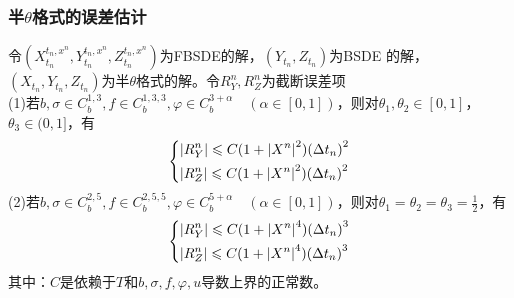 		\subsubsection{半$\theta$格式的误差估计}
			\par
			令$(X_{t_n}^{{t_n},{x^n}},Y_{t_n}^{{t_n},{x^n}},Z_{t_n}^{{t_n},{x^n}})$为FBSDE的解，$(Y_{t_n},Z_{t_n})$为BSDE 的解，$(X_{t_n},Y_{t_n},Z_{t_n})$为半$\theta$格式的解。令$R_Y^n,R_Z^n$为截断误差项\\
			\noindent (1)若${b,\sigma} \in C_b^{1,3},f \in C_b^{1,3,3},\varphi \in C_b^{3+\alpha}\quad (\alpha \in [0,1])$，则对${\theta_1,\theta_2 }\in [0,1]$，$\theta_3 \in (0,1]$，有
					\begin{equation*}
					\centering
					\left\{\begin{lgathered}
					{\left| {R_Y^n} \right| \leqslant C(1+{|X^n|}^2){({\Delta {t_n}})}^2}\\
					{\left| {R_Z^n} \right| \leqslant C(1+{|X^n|}^2){({\Delta {t_n}})}^2}
					\end{lgathered} \right.
						\end{equation*}
			\noindent (2)若${b,\sigma} \in C_b^{2,5},f \in C_b^{2,5,5},\varphi \in C_b^{5+\alpha}\quad (\alpha \in [0,1])$，则对$\theta_1=\theta_2 =\theta_3 =\frac 12$，有
					\begin{equation*}
					\centering
					\left\{\begin{lgathered}
					{\left| {R_Y^n} \right| \leqslant C(1+{|X^n|}^4){({\Delta {t_n}})}^3}\\
					{\left| {R_Z^n} \right| \leqslant C(1+{|X^n|}^4){({\Delta {t_n}})}^3}
					\end{lgathered} \right.
					\end{equation*}
			其中：$C$是依赖于$T$和$b,\sigma,f,\varphi,u$导数上界的正常数。%
